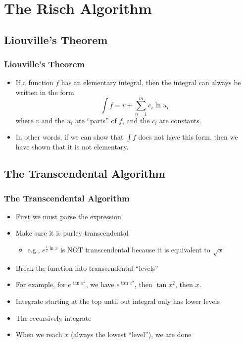 \documentclass{beamer}
\numberwithin{equation}{section} %
\begin{document}
\section{The Risch Algorithm}

\subsection{Liouville's Theorem}

\begin{frame}
    \frametitle{Liouville's Theorem}
    \begin{itemize}
        \item If a function $f$ has an elementary integral, then the
        integral can always be written in the form
        \begin{equation}
            \label{liouville's theorem}
            \int{f} = v + \sum_{n=1}^m{c_i\ln{u_i}}
        \end{equation}
        where $v$ and the $u_i$ are ``parts'' of $f$, and the $c_i$ are
        constants.
        \pause
        \item In other words, if we can show that $\int{f}$ does not
        have this form, then we have shown that it is not elementary.
    \end{itemize}
\end{frame}

\subsection{The Transcendental Algorithm}

\begin{frame}
    \frametitle{The Transcendental Algorithm}
    \begin{itemize}
        \item First we must parse the expression
        \item Make sure it is purley transcendental
        \begin{itemize}
            \item e.g., $e^{\frac{1}{2}\ln{x}}$ is NOT transcendental
            because it is equivalent to $\sqrt{x}$
        \end{itemize}
    \pause
    \item Break the function into transcendental ``levels''
    \item For example, for $e^{\tan{x^2}}$, we have $e^{\tan{x^2}}$,
    then $\tan{x^2}$, then $x$.
    \pause
    \item Integrate starting at the top until out integral only has
    lower levels
    \item The recursively integrate
    \item When we reach $x$ (always the lowest ``level''), we are done
    \end{itemize}
\end{frame}
\end{document}
